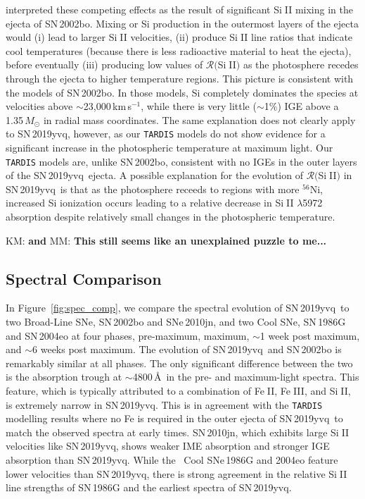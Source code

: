 \documentclass[twocolumn]{aastex63}
\def\ion#1#2{#1$\;${\footnotesize\rm{#2}}\relax}
\newcommand{\kate}[1]{{\color{red} KM: \textbf{#1}}}
\newcommand{\magee}[1]{{\color{Rust} MM: \textbf{#1}}}
\newcommand{\kms}{km\,s$^{-1}$}
\newcommand{\radni}{$^{56}$Ni}
\newcommand{\sn}{SN\,2019yvq}
\begin{document}
\citet{Benetti04} interpreted these competing effects as the result of
significant \ion{Si}{II} mixing in the ejecta of SN\,2002bo. Mixing or Si
production in the outermost layers of the ejecta would (i) lead to larger
\ion{Si}{II} velocities, (ii) produce \ion{Si}{II} line ratios that indicate
cool temperatures (because there is less radioactive material to heat the
ejecta), before eventually (iii) producing low values of
$\mathcal{R}($\ion{Si}{II}$)$ as the photosphere recedes through the ejecta
to higher temperature regions. This picture is consistent with the
\citet{Stehle05} models of SN\,2002bo. In those models, Si completely
dominates the species at velocities above $\sim$23,000\,\kms, while there is
very little ($\sim$1\%) IGE above a 1.35\,$M_\odot$ in radial mass
coordinates. The same explanation does not clearly apply to \sn, however, as
our \texttt{TARDIS} models do not show evidence for a significant increase
in the photospheric temperature at maximum light. Our \texttt{TARDIS} models
are, unlike SN\,2002bo, consistent with no IGEs in the outer layers of the
\sn\ ejecta. A possible explanation for the evolution of
$\mathcal{R}($\ion{Si}{II}$)$ in \sn\ is that as the photosphere receeds to
regions with more \radni, increased Si ionization occurs leading to a
relative decrease in \ion{Si}{II} $\lambda$5972 absorption despite
relatively small changes in the photospheric temperature.

\kate{and} \magee{This still seems like an unexplained puzzle to me...}

\subsection{Spectral Comparison}\label{sec:spec_comp}

In Figure~\ref{fig:spec_comp}, we compare the spectral evolution of \sn\ to
two Broad-Line SNe, SN\,2002bo and SNe\,2010jn, and two Cool SNe, SN\,1986G
and SN\,2004eo \citep{Cristiani92,
Benetti04,Pastorello07,Silverman11,Hachinger13,Maguire14} at four phases,
pre-maximum, maximum, $\sim$1 week post maximum, and $\sim$6 weeks post
maximum. The evolution of \sn\ and SN\,2002bo is remarkably similar at all
phases. The only significant difference between the two is the absorption
trough at $\sim$4800\,\AA\ in the pre- and maximum-light spectra. This
feature, which is typically attributed to a combination of \ion{Fe}{II},
\ion{Fe}{III}, and \ion{Si}{II}, is extremely narrow in \sn. This is in
agreement with the \texttt{TARDIS} modelling results where no Fe is required
in the outer ejecta of \sn\ to match the observed spectra at early times.
SN\,2010jn, which exhibits large \ion{Si}{II} velocities like \sn, shows
weaker IME absorption and stronger IGE absorption than \sn. While the
\citeauthor{Branch06}~Cool SNe\,1986G and 2004eo feature lower velocities than
\sn, there is strong agreement in the relative \ion{Si}{II} line strengths of
SN\,1986G and the earliest spectra of \sn.
\end{document}
